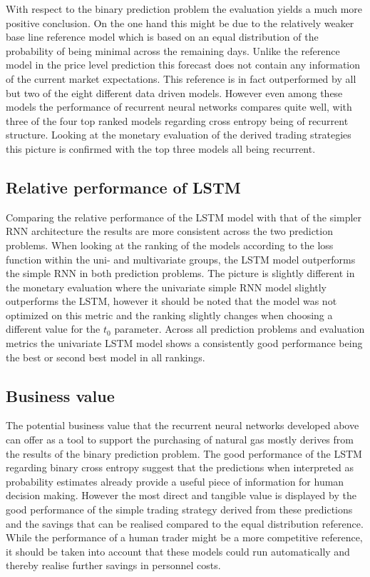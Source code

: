 With respect to the binary prediction problem the evaluation yields a much more positive conclusion. On the one hand this might be due to the relatively weaker base line reference model which is based on an equal distribution of the probability of being minimal across the remaining days. Unlike the reference model in the price level prediction this forecast does not contain any information of the current market expectations. This reference is in fact outperformed by all but two of the eight different data driven models. However even among these models the performance of recurrent neural networks compares quite well, with three of the four top ranked models regarding cross entropy being of recurrent structure. 
Looking at the monetary evaluation of the derived trading strategies this picture is confirmed with the top three models all being recurrent.
\subsection{Relative performance of LSTM}
Comparing the relative performance of the LSTM model with that of the simpler RNN architecture the results are more consistent across the two prediction problems. When looking at the ranking of the models according to the loss function within the uni- and multivariate groups, the LSTM model outperforms the simple RNN in both prediction problems. The picture is slightly different in the monetary evaluation where the univariate simple RNN model slightly outperforms the LSTM, however it should be noted that the model was not optimized on this metric and the ranking slightly changes when choosing a different value for the $t_0$ parameter. Across all prediction problems and evaluation metrics the univariate LSTM model shows a consistently good performance being the best or second best model in all rankings. 
\subsection{Business value}
The potential business value that the recurrent neural networks developed above can offer as a tool to support the purchasing of natural gas mostly derives from the results of the binary prediction problem. The good performance of the LSTM regarding binary cross entropy suggest that the predictions when interpreted as probability estimates already provide a useful piece of information for human decision making. However the most direct and tangible value is displayed by the good performance of the simple trading strategy derived from these predictions and the savings that can be realised compared to the equal distribution reference. While the performance of a human trader might be a more competitive reference, it should be taken into account that these models could run automatically and thereby realise further savings in personnel costs.
